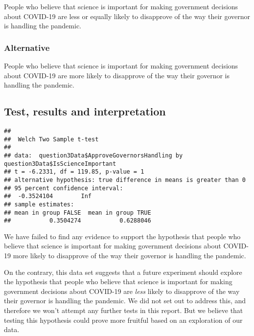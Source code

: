 \documentclass[
]{article}
\newenvironment{Shaded}{\begin{snugshade}}{\end{snugshade}}
\newcommand{\DataTypeTok}[1]{\textcolor[rgb]{0.13,0.29,0.53}{#1}}
\newcommand{\KeywordTok}[1]{\textcolor[rgb]{0.13,0.29,0.53}{\textbf{#1}}}
\newcommand{\NormalTok}[1]{#1}
\newcommand{\OperatorTok}[1]{\textcolor[rgb]{0.81,0.36,0.00}{\textbf{#1}}}
\newcommand{\StringTok}[1]{\textcolor[rgb]{0.31,0.60,0.02}{#1}}
\begin{document}
People who believe that science is important for making government
decisions about COVID-19 are less or equally likely to disapprove of the
way their governor is handling the pandemic.

\hypertarget{alternative}{%
\subsubsection{Alternative}\label{alternative}}

People who believe that science is important for making government
decisions about COVID-19 are more likely to disapprove of the way their
governor is handling the pandemic.

\hypertarget{test-results-and-interpretation}{%
\subsection{Test, results and
interpretation}\label{test-results-and-interpretation}}

\begin{Shaded}
\end{Shaded}

\begin{verbatim}
## 
##  Welch Two Sample t-test
## 
## data:  question3Data$ApproveGovernorsHandling by question3Data$IsScienceImportant
## t = -6.2331, df = 119.85, p-value = 1
## alternative hypothesis: true difference in means is greater than 0
## 95 percent confidence interval:
##  -0.3524104        Inf
## sample estimates:
## mean in group FALSE  mean in group TRUE 
##           0.3504274           0.6288046
\end{verbatim}

We have failed to find any evidence to support the hypothesis that
people who believe that science is important for making government
decisions about COVID-19 more likely to disapprove of the way their
governor is handling the pandemic.

On the contrary, this data set suggests that a future experiment should
explore the hypothesis that people who believe that science is important
for making government decisions about COVID-19 are \emph{less} likely to
disapprove of the way their governor is handling the pandemic. We did
not set out to address this, and therefore we won't attempt any further
tests in this report. But we believe that testing this hypothesis could
prove more fruitful based on an exploration of our data.
\end{document}
